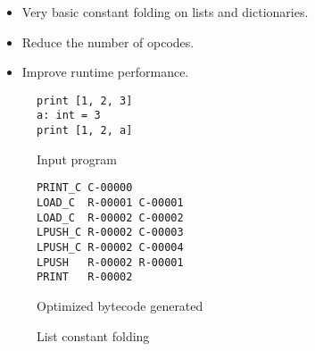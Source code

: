 \begin{slide}
    \begin{itemize}
        \item Very basic constant folding on lists and dictionaries.
    \end{itemize}
    \begin{itemize}
        \item Reduce the number of opcodes.
        \item Improve runtime performance.
    \end{itemize}
\end{slide}
\begin{slide}
    \begin{figure}[H]
        \centering
        \begin{subtable}{0.3\textwidth}
            \begin{verbatim}
print [1, 2, 3]
a: int = 3
print [1, 2, a]
            \end{verbatim}
        \caption{Input program}
        \end{subtable}
        \begin{subtable}{0.6\textwidth}
            \begin{verbatim}
PRINT_C C-00000
LOAD_C  R-00001 C-00001
LOAD_C  R-00002 C-00002
LPUSH_C R-00002 C-00003
LPUSH_C R-00002 C-00004
LPUSH   R-00002 R-00001
PRINT   R-00002
            \end{verbatim}
        \caption{Optimized bytecode generated}
        \end{subtable}
    \caption{List constant folding}
    \end{figure}
\end{slide}
